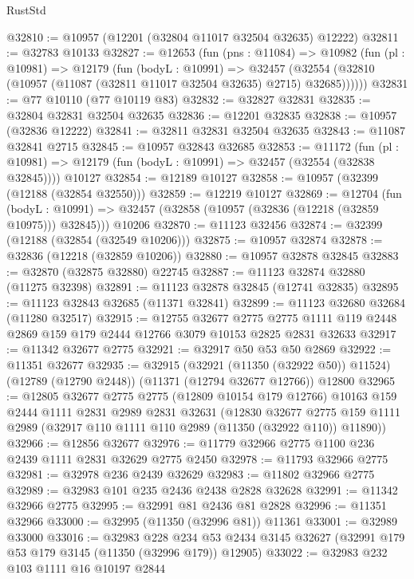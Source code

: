 \begin{lexlean}{RustStd}
\begin{coremodule}
@32810 := @10957 (@12201 (@32804 @11017 @32504 @32635) @12222)
@32811 := @32783 @10133
@32827 := @12653
    (fun (pns : @11084) =>
    @10982
      (fun (pl : @10981) =>
      @12179
        (fun (bodyL : @10991) =>
        @32457 (@32554 (@32810 (@10957 (@11087 (@32811 @11017 @32504 @32635) @2715) @32685))))))
@32831 := @77 @10110 (@77 @10119 @83)
@32832 := @32827 @32831
@32835 := @32804 @32831 @32504 @32635
@32836 := @12201 @32835
@32838 := @10957 (@32836 @12222)
@32841 := @32811 @32831 @32504 @32635
@32843 := @11087 @32841 @2715
@32845 := @10957 @32843 @32685
@32853 := @11172
    (fun (pl : @10981) => @12179 (fun (bodyL : @10991) => @32457 (@32554 (@32838 @32845))))
    @10127
@32854 := @12189 @10127
@32858 := @10957 (@32399 (@12188 (@32854 @32550)))
@32859 := @12219 @10127
@32869 := @12704
    (fun (bodyL : @10991) => @32457 (@32858 (@10957 (@32836 (@12218 (@32859 @10975))) @32845)))
    @10206
@32870 := @11123 @32456
@32874 := @32399 (@12188 (@32854 (@32549 @10206)))
@32875 := @10957 @32874
@32878 := @32836 (@12218 (@32859 @10206))
@32880 := @10957 @32878 @32845
@32883 := @32870 (@32875 @32880) @22745
@32887 := @11123 @32874 @32880 (@11275 @32398)
@32891 := @11123 @32878 @32845 (@12741 @32835)
@32895 := @11123 @32843 @32685 (@11371 @32841)
@32899 := @11123 @32680 @32684 (@11280 @32517)
@32915 := @12755
    @32677
    @2775
    @2775
    @1111
    @119
    @2448
    @2869
    @159
    @179
    @2444
    @12766
    @3079
    @10153
    @2825
    @2831
    @32633
@32917 := @11342 @32677 @2775
@32921 := @32917 @50 @53 @50 @2869
@32922 := @11351 @32677
@32935 := @32915
    (@32921 (@11350 (@32922 @50)) @11524)
    (@12789 (@12790 @2448))
    (@11371 (@12794 @32677 @12766))
    @12800
@32965 := @12805
    @32677
    @2775
    @2775
    (@12809 @10154 @179 @12766)
    @10163
    @159
    @2444
    @1111
    @2831
    @2989
    @2831
    @32631
    (@12830
      @32677
      @2775
      @159
      @1111
      @2989
      (@32917 @110 @1111 @110 @2989 (@11350 (@32922 @110)) @11890))
@32966 := @12856 @32677
@32976 := @11779 @32966 @2775 @1100 @236 @2439 @1111 @2831 @32629 @2775 @2450
@32978 := @11793 @32966 @2775
@32981 := @32978 @236 @2439 @32629
@32983 := @11802 @32966 @2775
@32989 := @32983 @101 @235 @2436 @2438 @2828 @32628
@32991 := @11342 @32966 @2775
@32995 := @32991 @81 @2436 @81 @2828
@32996 := @11351 @32966
@33000 := @32995 (@11350 (@32996 @81)) @11361
@33001 := @32989 @33000
@33016 := @32983
    @228
    @234
    @53
    @2434
    @3145
    @32627
    (@32991 @179 @53 @179 @3145 (@11350 (@32996 @179)) @12905)
@33022 := @32983 @232 @103 @1111 @16 @10197 @2844

\end{coremodule}
\end{lexlean}
